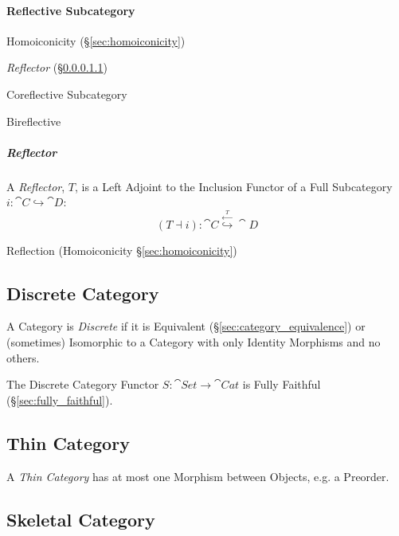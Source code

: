 \paragraph{Reflective Subcategory}\label{sec:reflective_subcategory}\hfill

Homoiconicity (\S\ref{sec:homoiconicity})

\emph{Reflector} (\S\ref{sec:reflector})

Coreflective Subcategory

Bireflective



\subparagraph{Reflector}\label{sec:reflector}\hfill


A \emph{Reflector}, $T$, is a Left Adjoint to the Inclusion Functor of
a Full Subcategory $i : \cat{C} \hookrightarrow \cat{D}$:
\[
  (T \dashv i) :
  \cat{C} \stackrel{\xleftarrow{T}}{\hookrightarrow} \cat{D}
\]

Reflection (Homoiconicity \S\ref{sec:homoiconicity})



\subsection{Discrete Category}\label{sec:discrete_category}

A Category is \emph{Discrete} if it is Equivalent
(\S\ref{sec:category_equivalence}) or (sometimes) Isomorphic to a
Category with only Identity Morphisms and no others.

The Discrete Category Functor $S : \cat{Set} \rightarrow
\cat{Cat}$ is Fully Faithful (\S\ref{sec:fully_faithful}).



\subsection{Thin Category}\label{sec:thin_category}

A \emph{Thin Category} has at most one Morphism between Objects, e.g.
a Preorder.



\subsection{Skeletal Category}\label{sec:skeletal_category}


